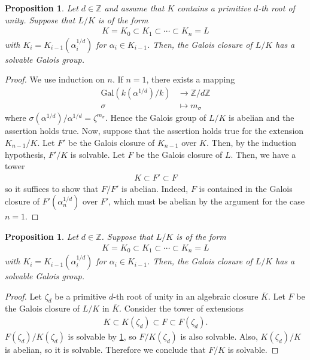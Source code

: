 \documentclass[12pt]{report}
\theoremstyle{plain}
\newtheorem{proposition}[theorem]{Proposition}
\theoremstyle{remark}
\theoremstyle{definition}
\newcommand{\Z}{\mathbb{Z}}
\begin{document}
\begin{proposition}\label{Proposiiton 3.14.2.}
    Let $d\in\Z$ and assume that $K$ contains a primitive $d$-th root of unity. Suppose that $L/K$ is of the form
    \begin{align*}
        K=K_0\subset K_1\subset \cdots\subset K_n=L
    \end{align*}
    with $K_i=K_{i-1}(\alpha_i^{1/d})$ for $\alpha_i\in K_{i-1}$. Then, the Galois closure of $L/K$ has a solvable Galois group.
\end{proposition}
\begin{proof}
    We use induction on $n$. If $n=1$, there exists a mapping
    \begin{align*}
        \mathrm{Gal}(k(\alpha^{1/d})/k) &\rightarrow \Z/d\Z \\
        \sigma &\mapsto m_\sigma
    \end{align*}
    where $\sigma(\alpha^{1/d})/\alpha^{1/d}=\zeta^{m_\sigma}$. Hence the Galois group of $L/K$ is abelian and the assertion holds true. Now, suppose that the assertion holds true for the extension $K_{n-1}/K$. Let $F'$ be the Galois closure of $K_{n-1}$ over $K$. Then, by the induction hypothesis, $F'/K$ is solvable. Let $F$ be the Galois closure of $L$. Then, we have a tower
    \begin{align*}
        K\subset F'\subset F
    \end{align*}
    so it suffices to show that $F/F'$ is abelian. Indeed, $F$ is contained in the Galois closure of $F'(\alpha_n^{1/d})$ over $F'$, which must be abelian by the argument for the case $n=1$.
\end{proof}

\begin{proposition}
    Let $d\in\Z$. Suppose that $L/K$ is of the form
    \begin{align*}
        K=K_0\subset K_1\subset \cdots\subset K_n=L
    \end{align*}
    with $K_i=K_{i-1}(\alpha_i^{1/d})$ for $\alpha_i\in K_{i-1}$. Then, the Galois closure of $L/K$ has a solvable Galois group.
\end{proposition}
\begin{proof}
    Let $\zeta_d$ be a primitive $d$-th root of unity in an algebraic closure $\overline{K}$. Let $F$ be the Galois closure of $L/K$ in $\overline{K}$. Consider the tower of extensions
    \begin{align*}
        K \subset K(\zeta_d) \subset F \subset F(\zeta_d).
    \end{align*}
    $F(\zeta_d)/K(\zeta_d)$ is solvable by \ref{Proposiiton 3.14.2.}, so $F/K(\zeta_d)$ is also solvable. Also, $K(\zeta_d)/K$ is abelian, so it is solvable. Therefore we conclude that $F/K$ is solvable.
\end{proof}
\end{document}

